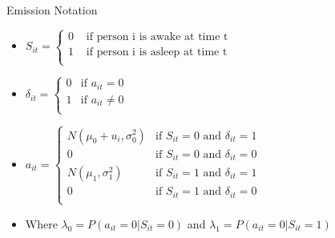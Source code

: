 \documentclass{beamer}
\begin{document}
\begin{frame}{Emission Notation}
\begin{itemize}
\item $S_{it}  = \begin{cases}
    0  & \text{ if person i is awake at time t} \\ 
    1  & \text{ if person i is asleep at time t} \\
\end{cases}$

\item $\delta_{it}  = \begin{cases}
    0  & \text{if } a_{it} = 0 \\ 
    1  & \text{if } a_{it} \neq 0 \\
\end{cases}$
\bigskip

    \item $a_{it}  = \begin{cases}
                    N(\mu_0 + u_i, \sigma^2_0) & \text{if } S_{it}=0 \text{ and } \delta_{it} = 1\\ 
                    0  & \text{if } S_{it}=0 \text{ and } \delta_{it} = 0\\ 
                    N(\mu_1,\sigma^2_1) & \text{if } S_{it}=1 \text{ and } \delta_{it} = 1\\ 
                    0 & \text{if } S_{it}=1 \text{ and } \delta_{it} = 0\\ 
    \end{cases}$
    \smallskip


\item Where $\lambda_0 = P(a_{it}=0|S_{it}=0)$ and $\lambda_1 = P(a_{it}=0|S_{it}=1)$
\end{itemize}
\end{frame}

\end{document}
